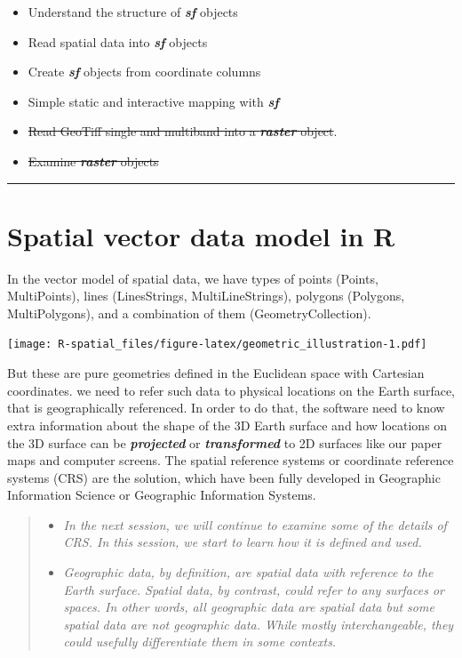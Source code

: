 \documentclass[
  11pt,
]{book}
\providecommand{\tightlist}{%
  \setlength{\itemsep}{0pt}\setlength{\parskip}{0pt}}
\begin{document}
\begin{itemize}
\tightlist
\item
  Understand the structure of \textbf{\emph{sf}} objects
\item
  Read spatial data into \textbf{\emph{sf}} objects
\item
  Create \textbf{\emph{sf}} objects from coordinate columns
\item
  Simple static and interactive mapping with \textbf{\emph{sf}}\\
\item
  \sout{Read GeoTiff single and multiband into a \textbf{\emph{raster}} object}.
\item
  \sout{Examine \textbf{\emph{raster}} objects}
\end{itemize}

\begin{center}\rule{0.5\linewidth}{0.5pt}\end{center}

\hypertarget{spatial-vector-data-model-in-r}{%
\section{Spatial vector data model in R}\label{spatial-vector-data-model-in-r}}

In the vector model of spatial data, we have types of points (Points, MultiPoints), lines (LinesStrings, MultiLineStrings), polygons (Polygons, MultiPolygons), and a combination of them (GeometryCollection).

\texttt{[image: R-spatial\_files/figure-latex/geometric\_illustration-1.pdf]}

But these are pure geometries defined in the Euclidean space with Cartesian coordinates. we need to refer such data to physical locations on the Earth surface, that is geographically referenced. In order to do that, the software need to know extra information about the shape of the 3D Earth surface and how locations on the 3D surface can be \textbf{\emph{projected}} or \textbf{\emph{transformed}} to 2D surfaces like our paper maps and computer screens. The spatial reference systems or coordinate reference systems (CRS) are the solution, which have been fully developed in Geographic Information Science or Geographic Information Systems.

\begin{quote}
\begin{itemize}
\tightlist
\item
  \emph{In the next session, we will continue to examine some of the details of CRS. In this session, we start to learn how it is defined and used.}
\item
  \emph{Geographic data, by definition, are spatial data with reference to the Earth surface. Spatial data, by contrast, could refer to any surfaces or spaces. In other words, all geographic data are spatial data but some spatial data are not geographic data. While mostly interchangeable, they could usefully differentiate them in some contexts.}
\end{itemize}
\end{quote}
\end{document}
